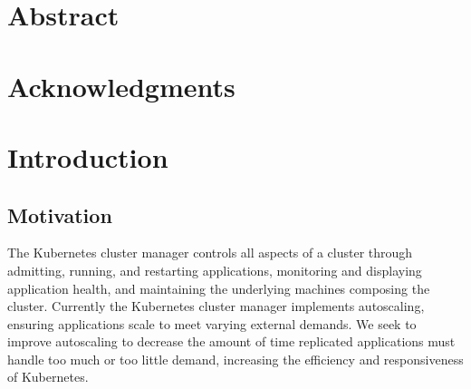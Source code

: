 \documentclass[twoside]{report}
\begin{document}

\tableofcontents

\onehalfspacing

\chapter*{Abstract}

\chapter*{Acknowledgments}



\chapter*{Introduction}

\section{Motivation}

The Kubernetes cluster manager\cite{k8s-website} controls all aspects of a
cluster through admitting, running, and restarting applications, monitoring and
displaying application health, and maintaining the underlying machines composing
the cluster. Currently the Kubernetes cluster manager implements autoscaling,
ensuring applications scale to meet varying external
demands.\cite{k8s-horizontal-pod-autoscaler-proposal} We seek to
improve autoscaling to decrease the amount of time
replicated applications must handle too much or too little demand, increasing
the efficiency and responsiveness of Kubernetes.
\end{document}
